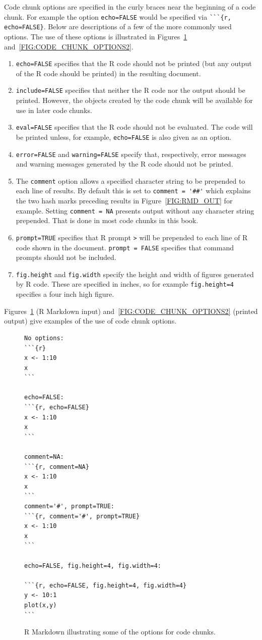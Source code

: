 \documentclass[12pt,oneside]{book}\usepackage[]{graphicx}\usepackage[]{color}
\begin{document}
Code chunk options are specified in the curly braces near the beginning of a code chunk. For example the option \verb+echo=FALSE+ would be specified via \verb+```{r, echo=FALSE}+. Below are descriptions of a few of the more commonly used options.  The use of these options is illustrated in Figures~\ref{FIG:CODE_CHUNK_OPTIONS1} and~\ref{FIG:CODE_CHUNK_OPTIONS2}.

\begin{enumerate}
\item \verb+echo=FALSE+ specifies that the R code should not be printed (but any output of the R code should be printed) in the resulting document. 
\item \verb+include=FALSE+ specifies that neither the R code nor the output should be printed. However, the objects created by the code chunk will be available for use in later code chunks. 
\item \verb+eval=FALSE+ specifies that the R code should not be evaluated. 
The code will be printed unless, for example, \verb+echo=FALSE+ is also given as an option.
\item \verb+error=FALSE+ and \verb+warning=FALSE+ specify that, respectively, error messages and warning messages generated by the R code should not be printed. 
\item The \verb+comment+ option allows a specified character string to be prepended to each line of results. By default this is set to \verb+comment = '##'+ which explains the two  hash marks preceding results in Figure~\ref{FIG:RMD_OUT} for example. Setting \verb+comment = NA+ presents output without any character string prepended. That is done in most code chunks in this book.
\item \verb+prompt=TRUE+ specifies that R prompt \verb+>+ will be prepended to each line of R code shown in the document. \verb+prompt = FALSE+ specifies that command prompts should not be included.
\item \verb+fig.height+ and \verb+fig.width+ specify the height and width of figures generated by R code. These are specified in inches, so for example \verb+fig.height=4+ specifies a four inch high figure.
\end{enumerate}

Figures~\ref{FIG:CODE_CHUNK_OPTIONS1} (R Markdown input) and~\ref{FIG:CODE_CHUNK_OPTIONS2} (printed output) give examples of the use of code chunk options. 

\begin{figure}[!ht]
\begin{verbatim}
No options:
```{r}
x <- 1:10
x
```

echo=FALSE:
```{r, echo=FALSE}
x <- 1:10
x
```

comment=NA:
```{r, comment=NA}
x <- 1:10
x
```
comment='#', prompt=TRUE:
```{r, comment='#', prompt=TRUE}
x <- 1:10
x
```

echo=FALSE, fig.height=4, fig.width=4:

```{r, echo=FALSE, fig.height=4, fig.width=4}
y <- 10:1
plot(x,y)
```
\end{verbatim}
\caption{R Markdown illustrating some of the options for code chunks.}
\label{FIG:CODE_CHUNK_OPTIONS1}
\end{figure}
\end{document}

